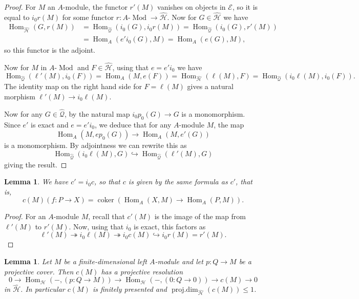 \documentclass[11pt,a4paper]{amsart}
\theoremstyle{plain}
\newtheorem{lem}[thm]{Lemma}
\theoremstyle{definition}
\begin{document}
\begin{proof}
For $M$ an $A$-module, the functor $r'(M)$ vanishes on objects in ${\mathcal{E}}$, so it is equal to $i_0 r(M)$
for some functor $r\colon \text{$A$-$\operatorname{Mod}$}\to {\widehat{\mathcal{H}}  }$. Now for $G\in {\widehat{\mathcal{H}}  }$ we have
\[
\begin{split}
\operatorname{Hom}_{\widehat{\mathcal{H}}  }(G,r(M)) 
&= \operatorname{Hom}_{ \widehat{\mathcal{Q}}}(i_0(G),i_0 r(M)) =
\operatorname{Hom}_{ \widehat{\mathcal{Q}}}(i_0(G),r'(M)) 
\\
&= \operatorname{Hom}_A (e' i_0(G),M) = \operatorname{Hom}_A(e(G),M), 
\end{split}
\]
so this functor is the adjoint.

Now for $M$ in $A$-$\operatorname{Mod}$ and $F\in{\widehat{\mathcal{H}}  }$, using that $e = e' i_0$ we have
\[
\operatorname{Hom}_{ \widehat{\mathcal{Q}}}(\ell'(M),i_0(F)) 
= \operatorname{Hom}_A(M,e(F))
= \operatorname{Hom}_{\widehat{\mathcal{H}}  }(\ell(M),F) = \operatorname{Hom}_{ \widehat{\mathcal{Q}}}(i_0\ell(M),i_0(F)).
\]
The identity map on the right hand side for $F=\ell(M)$ gives a natural morphism
$\ell'(M)\to i_0 \ell(M)$. 

Now for any $G\in{ \widehat{\mathcal{Q}}}$, 
by \cite[Proposition 4.2]{FP} the natural map $i_0 p_0(G)\to G$
is a monomorphism. Since $e'$ is exact and $e=e' i_0$, we deduce that for any $A$-module $M$, the map 
\[
\operatorname{Hom}_A(M,e p_0(G))\to \operatorname{Hom}_A(M,e'(G))
\]
is a monomorphism.
By adjointness we can rewrite this as 
\[
\operatorname{Hom}_{ \widehat{\mathcal{Q}}}(i_0 \ell(M),G) \hookrightarrow \operatorname{Hom}_{ \widehat{\mathcal{Q}}}(\ell'(M),G)
\]
giving the result.
\end{proof}

\begin{lem}
We have $c' = i_0 c$, so that $c$ is given by the same formula as $c'$, that is,
\[
c(M)(f\colon P\to X) = \operatorname{coker} \left(\operatorname{Hom}_A(X,M) \to \operatorname{Hom}_A(P,M) \right).
\]
\end{lem}

\begin{proof}
For an $A$-module $M$, recall that $c'(M)$ is the image of the map from $\ell'(M)$ to $r'(M)$. 
Now, using that $i_0$ is exact, this factors as
\[
\ell'(M) \twoheadrightarrow i_0 \ell(M) \twoheadrightarrow i_0 c(M)
\hookrightarrow i_0 r(M) = r'(M).
\]
\end{proof}

\begin{lem}
\label{l:cpd}
Let $M$ be a finite-dimensional left $A$-module and let $p\colon Q\to M$ be a projective cover.
Then ${c} (M)$ has a projective resolution
\[
0\to \operatorname{Hom}_{\mathcal{H}}(- , (p\colon Q\to M))\to \operatorname{Hom}_{\mathcal{H}}(- , (0\colon Q\to 0) ) \to {c} (M)\to 0
\]
in ${\widehat{\mathcal{H}}  }$. In particular ${c}(M)$ is finitely presented and $\operatorname{proj.dim}_{\widehat{\mathcal{H}}  } ({c} (M)) \leq 1$.
\end{lem}
\end{document}

